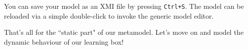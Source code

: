 You can save your model as an XMI file by pressing \texttt{Ctrl+S}.
The model can be reloaded via a simple double-click to invoke the generic model editor.

That's all for the ``static part" of our metamodel. Let's move on and model the dynamic behaviour of our learning box!

